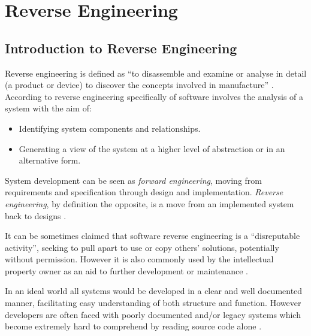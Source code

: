 \section{Reverse Engineering}\label{lit-reverseengineering}

\subsection{Introduction to Reverse Engineering}\label{lit-reverseengineering-introduction}

Reverse engineering is defined as ``to disassemble and examine or analyse in detail (a product or device) to discover the concepts involved in manufacture'' \citep{reverseengineeringdictionary}. According to \cite{chikofsky1990reverse} reverse engineering specifically of software involves the analysis of a system with the aim of:
\begin{itemize}
\item Identifying system components and relationships.
\item Generating a view of the system at a higher level of abstraction or in an alternative form.
\end{itemize}

System development can be seen as \textit{forward engineering}, moving from requirements and specification through design and implementation. \textit{Reverse engineering}, by definition the opposite, is a move from an implemented system back to designs \citep{roscoelooking}.

It can be sometimes claimed that software reverse engineering is a ``disreputable activity'', seeking to pull apart to use or copy others' solutions, potentially without permission. However it is also commonly used by the intellectual property owner as an aid to further development or maintenance \citep{roscoelooking}.

In an ideal world all systems would be developed in a clear and well documented manner, facilitating easy understanding of both structure and function. However developers are often faced with poorly documented and/or legacy systems which become extremely hard to comprehend by reading source code alone \citep{philippow2005approach,counsell2004design,meyer2006pattern}.

